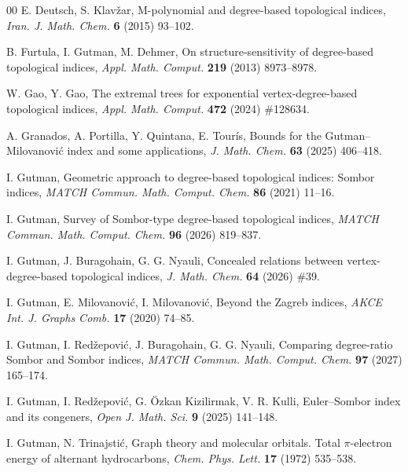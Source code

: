 \documentclass[a5paper, 10pt]{article}
\theoremstyle{plain}
\theoremstyle{remark}
\theoremstyle{definition}
\begin{document}
\begin{thebibliography}{00}
   E. Deutsch, S. Klav\v{z}ar, M-polynomial and
  degree-based topological indices, \textit{Iran. J. Math. Chem.\/} \textbf{6}
  (2015) 93--102.

   B. Furtula, I. Gutman, M. Dehmer, On
  structure-sensitivity of degree-based topological indices, \textit{Appl.
  Math. Comput.\/} \textbf{219} (2013) 8973--8978.

   W. Gao, Y. Gao, The extremal trees for
  exponential vertex-degree-based topological indices, \textit{Appl.
  Math. Comput.\/} \textbf{472} (2024) \#128634.

   A. Granados, A. Portilla, Y. Quintana,
  E. Tour\'is, Bounds for the Gutman--Milovanovi\'c index and some
  applications, \textit{J. Math. Chem.\/} \textbf{63} (2025)
  406--418.

   I. Gutman, Geometric approach to degree-based
  topological indices: Sombor indices, \textit{MATCH Commun. Math. Comput.
  Chem.\/} \textbf{86} (2021) 11--16.

   I. Gutman, Survey of Sombor-type
  degree-based topological indices, \textit{MATCH Commun. Math. Comput.
  Chem.\/} \textbf{96} (2026) 819--837.

   I. Gutman, J. Buragohain,
  G. G. Nyauli, Concealed relations between vertex-degree-based
  topological indices, \textit{J. Math. Chem.\/} \textbf{64} (2026) \#39.

   I. Gutman, E. Milovanovi\'c,
  I. Milovanovi\'c, Beyond the Zagreb indices, \textit{AKCE Int. J.
  Graphs Comb.\/} \textbf{17} (2020) 74--85.

   I. Gutman, I. Red\v{z}epovi\'c,
  J. Buragohain, G. G. Nyauli, Comparing degree-ratio Sombor and Sombor indices,
  \textit{MATCH Commun. Math. Comput. Chem.\/} \textbf{97} (2027) 165--174.

   I. Gutman, I. Red\v{z}epovi\'c,
  G. \"Ozkan Kizilirmak, V. R. Kulli, Euler--Sombor index and its congeners,
  \textit{Open J. Math. Sci.\/} \textbf{9} (2025) 141--148.

   I. Gutman, N. Trinajsti\'c, Graph theory
  and molecular orbitals. Total $\pi$-electron energy of alternant
  hydrocarbons, \textit{Chem. Phys. Lett.\/} \textbf{17} (1972) 535--538.


\end{thebibliography}
\end{document}
